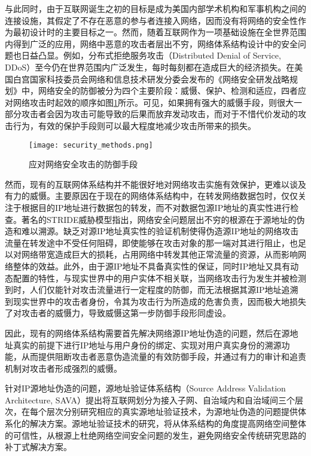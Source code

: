   与此同时，由于互联网诞生之初的目标是成为美国内部学术机构和军事机构之间的连接设施，其假定了不存在恶意的参与者连接入网络，因而没有将网络的安全性作为最初设计时的主要目标之一。然而，随着互联网作为一项基础设施在全世界范围内得到广泛的应用，网络中恶意的攻击者层出不穷，网络体系结构设计中的安全问题也日益凸显。例如，分布式拒绝服务攻击（Distributed Denial of Service, DDoS）\cite{mirkovic2004taxonomy,douligeris2004ddos}至今仍在世界范围内广泛发生，每时每刻都在造成巨大的经济损失\cite{Kaspersky,DDosCost}。在美国白宫国家科技委员会网络和信息技术研发分委会发布的《网络安全研发战略规划》\cite{USStrategyPlan}中，网络安全的防御被分为四个主要阶段：威慑、保护、检测和适应，四者应对网络攻击时起效的顺序如图\ref{fig:security_methods}所示。可见，如果拥有强大的威慑手段，则很大一部分攻击者会因为攻击可能导致的后果而放弃发动攻击，而对于不惜代价发动的攻击行为，有效的保护手段则可以最大程度地减少攻击所带来的损失。
  \begin{figure}[ht]
    \centering
    \texttt{[image: security\_methods.png]}
    \caption{应对网络安全攻击的防御手段}
    \label{fig:security_methods}
  \end{figure}

  然而，现有的互联网体系结构并不能很好地对网络攻击实施有效保护，更难以谈及有力的威慑。主要原因在于现在的网络体系结构中，在转发网络数据包时，仅仅关注于根据目的IP地址进行数据包的转发，而不对数据包源IP地址的真实性进行检查。著名的STRIDE威胁模型\cite{kohnfelder1999threats}指出，网络安全问题层出不穷的根源在于源地址的伪造和难以溯源。缺乏对源IP地址真实性的验证机制使得伪造源IP地址的网络攻击流量在转发途中不受任何阻碍，即使能够在攻击对象的那一端对其进行阻止，也足以对网络带宽造成巨大的损耗，占用网络中转发其他正常流量的资源，从而影响网络整体的效益。此外，由于源IP地址不具备真实性的保证，同时IP地址又具有动态配置的特性，与现实世界中的用户实体不相关联，当网络攻击行为发生并被检测到时，人们仅能针对攻击流量进行一定程度的防御，而无法根据其源IP地址追溯到现实世界中的攻击者身份，令其为攻击行为所造成的危害负责，因而极大地损失了对攻击者的威慑力，导致威慑这第一步防御手段形同虚设。

  因此，现有的网络体系结构需要首先解决网络源IP地址伪造的问题，然后在源地址真实的前提下进行IP地址与用户身份的绑定、实现对用户真实身份的溯源功能，从而提供阻断攻击者恶意伪造流量的有效防御手段，并通过有力的审计和追责机制对攻击者形成强烈的威慑。

  针对IP源地址伪造的问题，源地址验证体系结构（Source Address Validation Architecture, SAVA）\cite{RFC5210}提出将互联网划分为接入子网、自治域内和自治域间三个层次，在每个层次分别研究相应的真实源地址验证技术，为源地址伪造的问题提供体系化的解决方案。源地址验证技术的研究，将从体系结构的角度提高网络空间整体的可信性，从根源上杜绝网络空间安全问题的发生，避免网络安全传统研究思路的补丁式解决方案。

